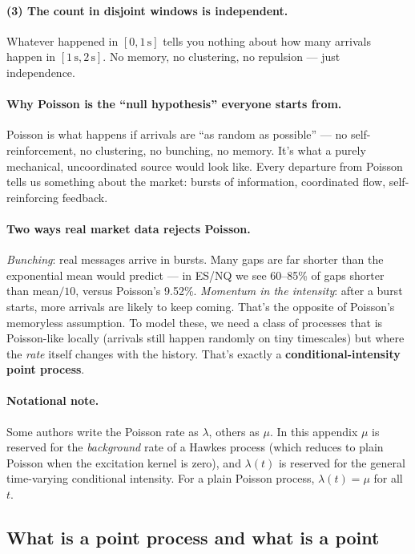 \paragraph{(3) The count in disjoint windows is independent.} Whatever happened in $[0, 1\,\mathrm{s}]$ tells you nothing about how many arrivals happen in $[1\,\mathrm{s}, 2\,\mathrm{s}]$. No memory, no clustering, no repulsion --- just independence.

\paragraph{Why Poisson is the ``null hypothesis'' everyone starts from.} Poisson is what happens if arrivals are ``as random as possible'' --- no self-reinforcement, no clustering, no bunching, no memory. It's what a purely mechanical, uncoordinated source would look like. Every departure from Poisson tells us something about the market: bursts of information, coordinated flow, self-reinforcing feedback.

\paragraph{Two ways real market data rejects Poisson.} \emph{Bunching}: real messages arrive in bursts. Many gaps are far shorter than the exponential mean would predict --- in ES/NQ we see 60--85\% of gaps shorter than mean$/10$, versus Poisson's 9.52\%. \emph{Momentum in the intensity}: after a burst starts, more arrivals are likely to keep coming. That's the opposite of Poisson's memoryless assumption. To model these, we need a class of processes that is Poisson-like locally (arrivals still happen randomly on tiny timescales) but where the \emph{rate} itself changes with the history. That's exactly a \textbf{conditional-intensity point process}.

\paragraph{Notational note.} Some authors write the Poisson rate as $\lambda$, others as $\mu$. In this appendix $\mu$ is reserved for the \emph{background} rate of a Hawkes process (which reduces to plain Poisson when the excitation kernel is zero), and $\lambda(t)$ is reserved for the general time-varying conditional intensity. For a plain Poisson process, $\lambda(t) = \mu$ for all $t$.

\subsection{What is a point process and what is a point}
\label{app:pp-pointprocess}

